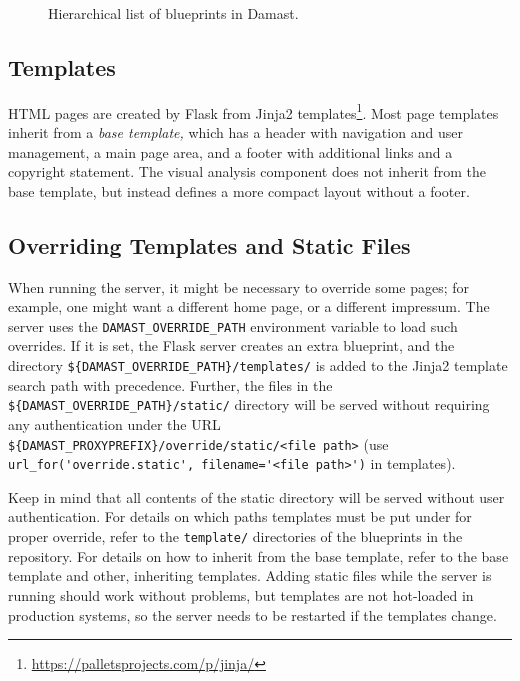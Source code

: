 \begin{figure}[tb]
  \caption{Hierarchical list of blueprints in Damast.}
  \label{fig:blueprints}
\end{figure}

\subsection{Templates}
\label{sec:templates}

HTML pages are created by Flask from Jinja2 templates\footnote{\url{https://palletsprojects.com/p/jinja/}}.
Most page templates inherit from a \emph{base template,} which has a header with navigation and user management, a main page area, and a footer with additional links and a copyright statement.
The visual analysis component does not inherit from the base template, but instead defines a more compact layout without a footer.


\subsection{Overriding Templates and Static Files}
\label{sec:override-blueprints}

When running the server, it might be necessary to override some pages;
for example, one might want a different home page, or a different impressum.
The server uses the \verb!DAMAST_OVERRIDE_PATH! environment variable to load such overrides.
If it is set, the Flask server creates an extra blueprint, and the directory \verb!${DAMAST_OVERRIDE_PATH}/templates/! is added to the Jinja2 template search path with precedence.
Further, the files in the \verb!${DAMAST_OVERRIDE_PATH}/static/! directory will be served without requiring any authentication under the URL \verb!${DAMAST_PROXYPREFIX}/override/static/<file path>! (use \verb!url_for('override.static', filename='<file path>')! in templates).

Keep in mind that all contents of the static directory will be served without user authentication.
For details on which paths templates must be put under for proper override, refer to the \verb!template/! directories of the blueprints in the repository.
For details on how to inherit from the base template, refer to the base template and other, inheriting templates.
Adding static files while the server is running should work without problems, but templates are not hot-loaded in production systems, so the server needs to be restarted if the templates change.

